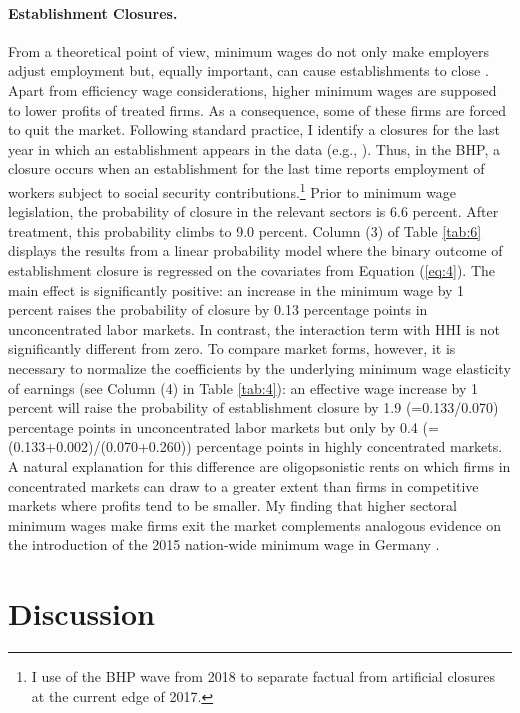 \documentclass[11pt,oneside,reqno,xcolor=dvipsnames]{article} %
\begin{document}
\paragraph{Establishment Closures.} From a theoretical point of view, minimum wages do not only make employers adjust employment but, equally important, can cause establishments to close \citep{Williamson1968}. Apart from efficiency wage considerations, higher minimum wages are supposed to lower profits of treated firms. As a consequence, some of these firms are forced to quit the market. Following standard practice, I identify a closures for the last year in which an establishment appears in the data (e.g., \citealp{FacklerEtAl2013}). Thus, in the BHP, a closure occurs when an establishment for the last time reports employment of workers subject to social security contributions.\footnote{I use of the BHP wave from 2018 to separate factual from artificial closures at the current edge of 2017.} Prior to minimum wage legislation, the probability of closure in the relevant sectors is 6.6 percent. After treatment, this probability climbs to 9.0 percent. Column (3) of Table \ref{tab:6} displays the results from a linear probability model where the binary outcome of establishment closure is regressed on the covariates from Equation (\ref{eq:4}). The main effect is significantly positive: an increase in the minimum wage by 1 percent raises the probability of closure by 0.13 percentage points in unconcentrated labor markets. In contrast, the interaction term with HHI is not significantly different from zero. To compare market forms, however, it is necessary to normalize the coefficients by the underlying minimum wage elasticity of earnings (see Column (4) in Table \ref{tab:4}): an effective wage increase by 1 percent will raise the probability of establishment closure by 1.9 (=0.133/0.070) percentage points in unconcentrated labor markets but only by 0.4 (=(0.133+0.002)/(0.070+0.260)) percentage points in highly concentrated markets. A natural explanation for this difference are oligopsonistic rents on which firms in concentrated markets can draw to a greater extent than firms in competitive markets where profits tend to be smaller. My finding that higher sectoral minimum wages make firms exit the market complements analogous evidence on the introduction of the 2015 nation-wide minimum wage in Germany \citep{DustmannEtAl2021}.






\section{Discussion}
\label{sec:8}
\end{document}
